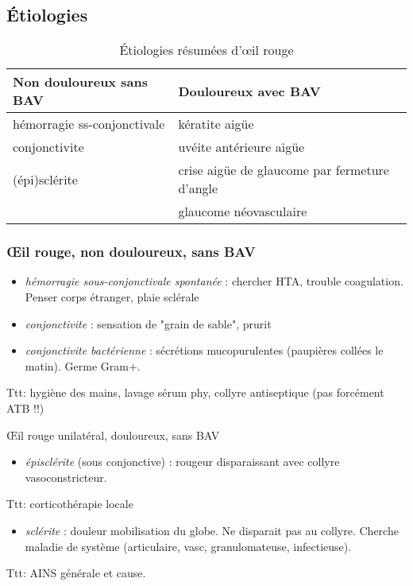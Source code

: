 \documentclass[11pt]{article}
\def\ttt{\hspace*{1cm}Ttt: }
\begin{document}
\subsection{Étiologies}
\label{sec:orgd272705}

\begin{table}[htbp]
\caption{Étiologies résumées d'\oe{}il rouge}
\centering
\begin{tabular}{ll}
\toprule
Non douloureux sans BAV & Douloureux avec BAV\\
\midrule
hémorragie ss-conjonctivale & kératite aigüe\\
conjonctivite & uvéite antérieure aigüe\\
(épi)sclérite & crise aigüe de glaucome par fermeture d'angle\\
 & glaucome néovasculaire\\
\bottomrule
\end{tabular}
\end{table}

\subsubsection{\OE{}il rouge, non douloureux, sans BAV}
\label{sec:orgec5e8a7}
\begin{itemize}
\item \emph{hémorragie sous-conjonctivale spontanée} : chercher HTA, trouble
coagulation. Penser corps étranger, plaie sclérale \danger
\item \emph{conjonctivite} : sensation de "grain de sable", prurit
\item \emph{conjonctivite bactérienne} : sécrétions mucopurulentes (paupières collées le
matin). Germe Gram+.
\end{itemize}
\ttt hygiène des mains, lavage sérum phy, collyre antiseptique (pas forcément ATB !!)

\OE{}il rouge unilatéral, douloureux, sans BAV
\begin{itemize}
\item \emph{épisclérite} (sous conjonctive) : rougeur disparaissant avec collyre
vasoconstricteur.
\end{itemize}
\ttt corticothérapie locale
\begin{itemize}
\item \emph{sclérite} : douleur \inc mobilisation du globe. Ne disparait pas au
collyre. Cherche maladie de système (articulaire, vasc, granulomateuse,
infectieuse).
\end{itemize}
\ttt AINS générale et cause.
\end{document}
